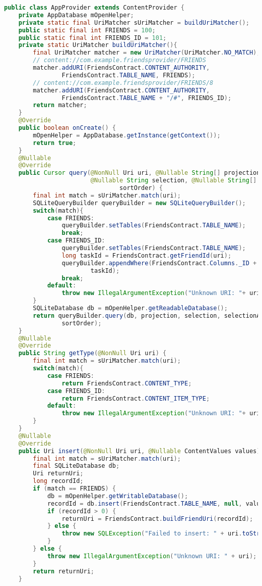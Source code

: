 \begin{lstlisting}[language=Java
	, label=lst:
	]
public class AppProvider extends ContentProvider {
	private AppDatabase mOpenHelper;
	private static final UriMatcher sUriMatcher = buildUriMatcher();
	public static final int FRIENDS = 100;
	public static final int FRIENDS_ID = 101;
	private static UriMatcher buildUriMatcher(){
		final UriMatcher matcher = new UriMatcher(UriMatcher.NO_MATCH);
		// content://com.example.friendsprovider/FRIENDS
		matcher.addURI(FriendsContract.CONTENT_AUTHORITY,
				FriendsContract.TABLE_NAME, FRIENDS);
		// content://com.example.friendsprovider/FRIENDS/8
		matcher.addURI(FriendsContract.CONTENT_AUTHORITY,
				FriendsContract.TABLE_NAME + "/#", FRIENDS_ID);
		return matcher;
	}
	@Override
	public boolean onCreate() {
		mOpenHelper = AppDatabase.getInstance(getContext());
		return true;
	}
	@Nullable
	@Override
	public Cursor query(@NonNull Uri uri, @Nullable String[] projection,
						@Nullable String selection, @Nullable String[] selectionArgs, @Nullable String
								sortOrder) {
		final int match = sUriMatcher.match(uri);
		SQLiteQueryBuilder queryBuilder = new SQLiteQueryBuilder();
		switch(match){
			case FRIENDS:
				queryBuilder.setTables(FriendsContract.TABLE_NAME);
				break;
			case FRIENDS_ID:
				queryBuilder.setTables(FriendsContract.TABLE_NAME);
				long taskId = FriendsContract.getFriendId(uri);
				queryBuilder.appendWhere(FriendsContract.Columns._ID + " = " +
						taskId);
				break;
			default:
				throw new IllegalArgumentException("Unknown URI: "+ uri);
		}
		SQLiteDatabase db = mOpenHelper.getReadableDatabase();
		return queryBuilder.query(db, projection, selection, selectionArgs, null, null,
				sortOrder);
	}
	@Nullable
	@Override
	public String getType(@NonNull Uri uri) {
		final int match = sUriMatcher.match(uri);
		switch(match){
			case FRIENDS:
				return FriendsContract.CONTENT_TYPE;
			case FRIENDS_ID:
				return FriendsContract.CONTENT_ITEM_TYPE;
			default:
				throw new IllegalArgumentException("Unknown URI: "+ uri);
		}
	}
	@Nullable
	@Override
	public Uri insert(@NonNull Uri uri, @Nullable ContentValues values) {
		final int match = sUriMatcher.match(uri);
		final SQLiteDatabase db;
		Uri returnUri;
		long recordId;
		if (match == FRIENDS) {
			db = mOpenHelper.getWritableDatabase();
			recordId = db.insert(FriendsContract.TABLE_NAME, null, values);
			if (recordId > 0) {
				returnUri = FriendsContract.buildFriendUri(recordId);
			} else {
				throw new SQLException("Failed to insert: " + uri.toString());
			}
		} else {
			throw new IllegalArgumentException("Unknown URI: " + uri);
		}
		return returnUri;
	}
	

\end{lstlisting}
